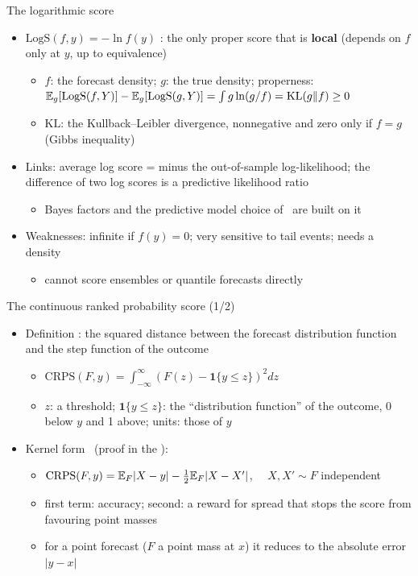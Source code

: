 \begin{frame}{The logarithmic score}
\itemsize{\small}
\begin{itemize}
    \item $\mathrm{LogS}(f, y) = -\ln f(y)$ : the only proper score that is \textbf{local} (depends on $f$ only at $y$, up to equivalence)
    \begin{itemize}
        \item $f$: the forecast density; $g$: the true density; properness: $\mathbb{E}_g[\mathrm{LogS}(f, Y)] - \mathbb{E}_g[\mathrm{LogS}(g, Y)] = \int g \ln(g/f) = \mathrm{KL}(g \| f) \ge 0$
        \item $\mathrm{KL}$: the Kullback--Leibler divergence, nonnegative and zero only if $f = g$ (Gibbs inequality)
    \end{itemize}
    \item Links: average log score = minus the out-of-sample log-likelihood; the difference of two log scores is a predictive likelihood ratio
    \begin{itemize}
        \item Bayes factors and the predictive model choice of \ are built on it
    \end{itemize}
    \item Weaknesses: infinite if $f(y) = 0$; very sensitive to tail events; needs a density
    \begin{itemize}
        \item cannot score ensembles or quantile forecasts directly
    \end{itemize}
\end{itemize}
\end{frame}

\begin{frame}{The continuous ranked probability score (1/2)}
\itemsize{\small}
\begin{itemize}
    \item Definition : the squared distance between the forecast distribution function and the step function of the outcome
    \begin{itemize}
        \item $\mathrm{CRPS}(F, y) = \int_{-\infty}^{\infty}(F(z) - \mathbf 1\{y \le z\})^2dz$
        \item $z$: a threshold; $\mathbf 1\{y \le z\}$: the ``distribution function'' of the outcome, 0 below $y$ and 1 above; units: those of $y$
    \end{itemize}
    \item Kernel form \ (proof in the ):
    \begin{itemize}
        \item $\mathrm{CRPS}(F, y) = \mathbb{E}_F|X - y| - \frac12\mathbb{E}_F|X - X'|$, $\quad X, X' \sim F$ independent
        \item first term: accuracy; second: a reward for spread that stops the score from favouring point masses
        \item for a point forecast ($F$ a point mass at $x$) it reduces to the absolute error $|y - x|$
    \end{itemize}
\end{itemize}
\end{frame}

